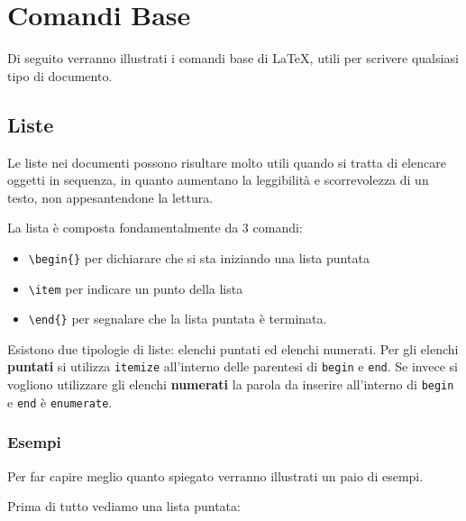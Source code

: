 \chapter{Comandi Base}

Di seguito verranno illustrati i comandi base di \LaTeX{}, utili per scrivere
qualsiasi tipo di documento.

\section{Liste}

Le liste nei documenti possono risultare molto utili quando si tratta di
elencare oggetti in sequenza, in quanto aumentano la leggibilità e
scorrevolezza di un testo, non appesantendone la lettura.

La lista è composta fondamentalmente da 3 comandi:
\begin{itemize}
 \item \verb!\begin{}! per dichiarare che si sta iniziando una
lista puntata
 \item \verb!\item! per indicare un punto della lista
 \item \verb!\end{}! per segnalare che la lista puntata è terminata.
\end{itemize}

Esistono due tipologie di liste: elenchi puntati ed elenchi numerati. Per gli
elenchi \textbf{puntati} si utilizza \texttt{itemize} all'interno delle
parentesi di \texttt{begin} e \texttt{end}. Se invece si vogliono utilizzare
gli elenchi \textbf{numerati} la parola da inserire all'interno di
\texttt{begin} e
\texttt{end} è \texttt{enumerate}.

\subsection{Esempi}

Per far capire meglio quanto spiegato verranno illustrati un paio di esempi.

\vspace{\abovedisplayskip}
\begin{minipage}{\linewidth}
  \noindent Prima di tutto vediamo una lista puntata:
  
\end{minipage}
\vspace{\belowdisplayskip}

